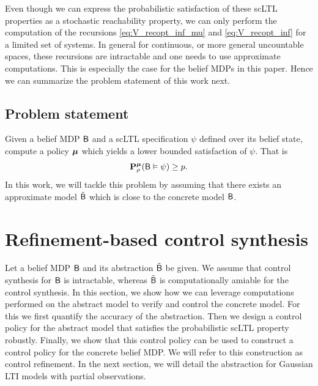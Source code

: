 \documentclass{ifacconf}
\newcommand{\new}[1]{{\color{blue}#1}}
\begin{document}
\new{Even though we can express the probabilistic satisfaction of these scLTL properties as a stochastic reachability property, we can only perform the computation of the recursions  \eqref{eq:V_recopt_inf_mu} and \eqref{eq:V_recopt_inf}  for a limited set of systems. In general for continuous, or more general uncountable spaces, these recursions are intractable and one needs to use  approximate computations.
This is especially the case for the belief MDPs in this paper.  Hence we can summarize the problem statement of this work next.}

\subsection{Problem statement}
\new{Given a belief MDP $\mathsf{B}$ and a scLTL specification $\psi$ defined over its belief state, compute a policy ${\boldsymbol{\mu}}$ which yields a lower bounded satisfaction of $\psi$. That is 
\begin{align}
 \mathbf{P}_\rho^{\boldsymbol{\mu}}(\mathsf{B}\vDash\psi)\geq p.
\end{align}
In this work, we will tackle this problem by assuming that there exists an approximate model $\tilde {\mathsf{B}}$ which is close to the concrete model $\mathsf{B}$.

}




\section{Refinement-based control synthesis} \label{sec:refinement}
\new{ Let a belief MDP $\mathsf{B}$ and its abstraction $\tilde {\mathsf{B}}$ be given.  
We assume that control synthesis for $\mathsf{B}$ is intractable, whereas $\tilde {\mathsf{B}}$ is computationally amiable for the control synthesis.
In this section, we show  how we can leverage computations performed on the abstract model to verify and control the concrete model. For this we first quantify the accuracy of the abstraction. Then we design a control policy for the abstract model that satisfies the probabilistic scLTL property robustly. Finally, we show that this control policy can be used to construct a control policy for the concrete belief MDP. We will refer to this construction as control refinement. In the next section, we will detail the abstraction for Gaussian  LTI models with partial observations.}
\end{document}
